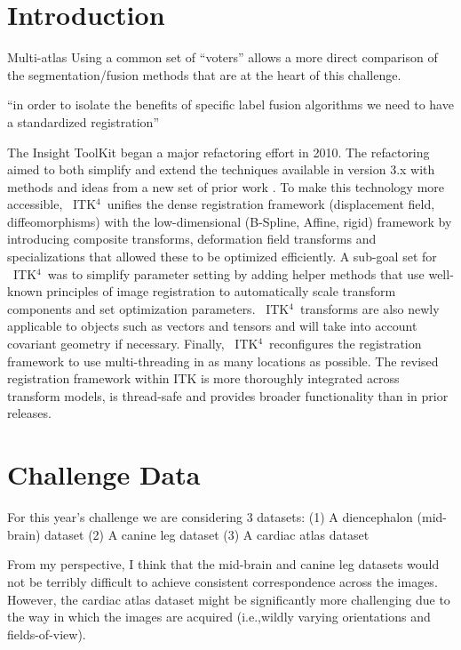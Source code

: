 \documentclass{llncs}
\newcommand{\tk}{~ITK$^{\text{4}}$~}
\begin{document}
\section{Introduction}
Multi-atlas 
Using a common set of ``voters'' allows a more
direct comparison of the segmentation/fusion methods that are at the
heart of this challenge.   

``in order to isolate the benefits of specific label fusion algorithms we need to have a standardized registration''

The Insight ToolKit began a major refactoring effort in 2010.
The refactoring aimed to both simplify and extend the techniques available in version
3.x with methods and ideas from a new set of prior work
\cite{Jenkinson2001,Christensen1996,Rueckert1999,Miller2005,Peyrat2010,Avants2011}.
To make this technology more accessible, \tk unifies the dense
registration framework (displacement field, diffeomorphisms)
with the low-dimensional (B-Spline, Affine, rigid) framework by
introducing composite transforms, deformation field transforms and
specializations that allowed these to be optimized efficiently.  A sub-goal set for \tk was to simplify
parameter setting by adding helper methods that use well-known
principles of image registration to automatically scale transform
components and set optimization parameters.  \tk transforms are also
newly applicable to objects such as vectors and tensors and will take into account covariant geometry if
necessary.  Finally, \tk reconfigures the registration framework
to use multi-threading in as many locations as possible.
The revised registration framework within ITK is more thoroughly
integrated across transform models, is thread-safe and provides
broader functionality than in prior releases. 




\section{Challenge Data}
 For this year's challenge we are considering 3 datasets:
(1) A diencephalon (mid-brain) dataset
(2) A canine leg dataset
(3) A cardiac atlas dataset

From my perspective, I think that the mid-brain and canine leg datasets would not be terribly difficult to achieve consistent correspondence across the images. However, the cardiac atlas dataset might be significantly more challenging due to the way in which the images are acquired (i.e.,wildly varying orientations and fields-of-view).
\end{document}
